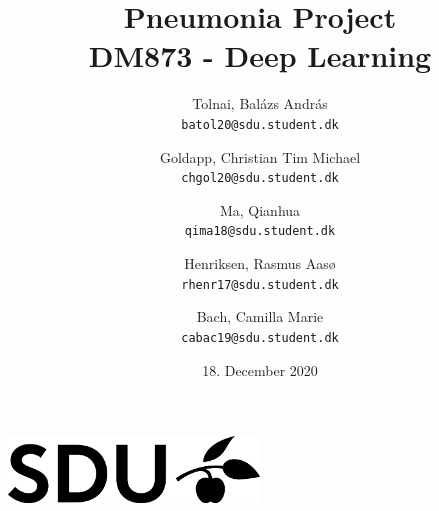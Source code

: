 \documentclass[11pt]{article}
\author{
	Tolnai, Balázs András\\
 	\texttt{batol20@sdu.student.dk}
  	\and  
  	Goldapp, Christian Tim Michael\\
  	\texttt{chgol20@sdu.student.dk}
  	\and
  	Ma, Qianhua\\
  	\texttt{qima18@sdu.student.dk}
  	\and
  	Henriksen, Rasmus Aasø\\
  	\texttt{rhenr17@sdu.student.dk}
  	\and
  	Bach, Camilla Marie\\
  	\texttt{cabac19@sdu.student.dk}
}
\date{18. December 2020}
\title{%
  \textbf{Pneumonia Project} \\
  \vspace{10mm}
  \large DM873 - Deep Learning}
\begin{document}
	\maketitle
	\thispagestyle{empty}
	\vspace{1.8cm}
       	\begin{center}
       		\includegraphics[width=0.5\textwidth]{SDU_BLACK_RGB}
       	\end{center}
	 	\vspace{1.8cm}
	\newpage
	\tableofcontents
	\newpage


	

	

	

	
	
\end{document}
